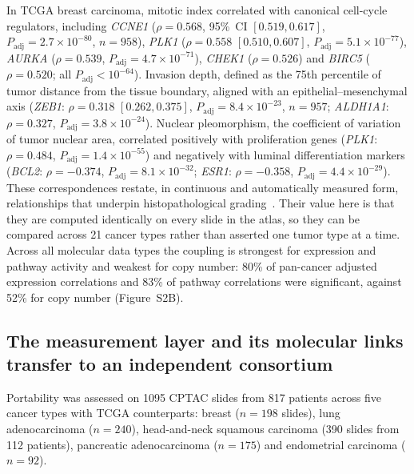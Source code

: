 In TCGA breast
carcinoma, mitotic index correlated with canonical cell-cycle regulators,
including \textit{CCNE1} ($\rho = 0.568$, 95\%~CI $[0.519, 0.617]$,
$P_{\mathrm{adj}} = 2.7 \times 10^{-80}$, $n = 958$), \textit{PLK1}
($\rho = 0.558$ $[0.510, 0.607]$, $P_{\mathrm{adj}} = 5.1 \times 10^{-77}$),
\textit{AURKA} ($\rho = 0.539$, $P_{\mathrm{adj}} = 4.7 \times 10^{-71}$),
\textit{CHEK1} ($\rho = 0.526$) and \textit{BIRC5} ($\rho = 0.520$; all
$P_{\mathrm{adj}} < 10^{-64}$). Invasion depth, defined as the 75th percentile of
tumor distance from the tissue boundary, aligned with an
epithelial--mesenchymal axis (\textit{ZEB1}: $\rho = 0.318$
$[0.262, 0.375]$, $P_{\mathrm{adj}} = 8.4 \times 10^{-23}$, $n = 957$;
\textit{ALDH1A1}: $\rho = 0.327$, $P_{\mathrm{adj}} = 3.8 \times 10^{-24}$).
Nuclear pleomorphism, the coefficient of variation of tumor nuclear area,
correlated positively with proliferation genes (\textit{PLK1}:
$\rho = 0.484$, $P_{\mathrm{adj}} = 1.4 \times 10^{-55}$) and negatively with
luminal differentiation markers (\textit{BCL2}: $\rho = -0.374$,
$P_{\mathrm{adj}} = 8.1 \times 10^{-32}$; \textit{ESR1}: $\rho = -0.358$,
$P_{\mathrm{adj}} = 4.4 \times 10^{-29}$). These correspondences restate, in
continuous and automatically measured form, relationships that underpin
histopathological grading~\cite{elston1991grading}. Their value here
is that they are computed identically on every slide in the atlas, so they can
be compared across 21 cancer types rather than asserted one tumor type at a time.
Across all molecular data types the coupling is strongest for expression and
pathway activity and weakest for copy number: 80\% of pan-cancer adjusted
expression correlations and 83\% of pathway correlations were significant,
against 52\% for copy number (Figure~S2B).

\subsection{The measurement layer and its molecular links transfer to an independent consortium}
\label{sec:results:transfer}

Portability was assessed on \num{1095} CPTAC slides from 817 patients across five
cancer types with TCGA counterparts: breast ($n = 198$ slides), lung
adenocarcinoma ($n = 240$), head-and-neck squamous carcinoma (390 slides from 112
patients), pancreatic adenocarcinoma ($n = 175$) and endometrial carcinoma
($n = 92$).

